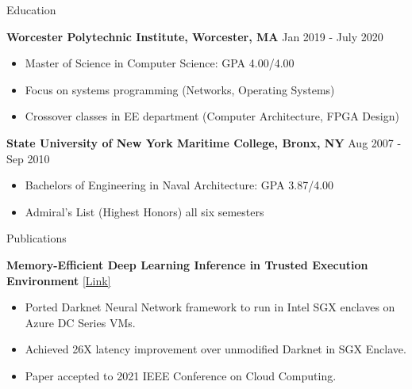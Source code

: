 \documentclass[10pt,a4paper]{article}
\begin{document}
{\begin{tcolorbox}

  {\selectfont
    \begin{center}
      \LARGE{Education}
    \end{center}
  }

  \tcblower

      \large{\textbf{Worcester Polytechnic Institute, Worcester, MA }}
      \hfill
      \large{Jan 2019 - July 2020}
      \begin{itemize}[noitemsep]
        \item Master of Science in Computer Science: GPA 4.00/4.00
        \item Focus on systems programming (Networks, Operating Systems)
        \item Crossover classes in EE department (Computer Architecture, FPGA Design)

      \end{itemize}

      \large{\textbf{State University of New York Maritime College, Bronx, NY}}
      \hfill
      \large{Aug 2007 - Sep 2010}
      \begin{itemize}[noitemsep]
        \item Bachelors of Engineering in Naval Architecture: GPA 3.87/4.00
        \item Admiral's List (Highest Honors) all six semesters
      \end{itemize}
\end{tcolorbox}

\begin{tcolorbox}

  {\selectfont
    \begin{center}
      \LARGE{Publications}
    \end{center}
  }

  \tcblower

  \large\textbf{Memory-Efficient Deep Learning Inference in Trusted Execution Environment }
  \href{http://arxiv-export-lb.library.cornell.edu/abs/2104.15109?context=cs.LG}{[Link]}
  \begin{itemize}[noitemsep]
  \item Ported Darknet Neural Network framework to run in Intel SGX enclaves on Azure DC Series VMs.
    \item Achieved 26X latency improvement over unmodified Darknet in SGX Enclave.
    \item Paper accepted to 2021 IEEE Conference on Cloud Computing.
  \end{itemize}
\end{tcolorbox}


}
\end{document}
